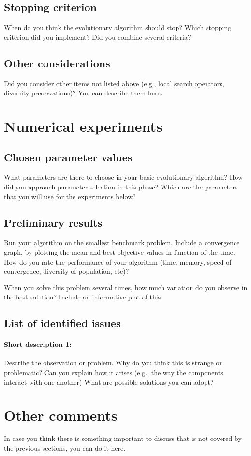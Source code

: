 \documentclass[a4paper,10pt]{article}
\newcommand{\ReplaceMe}[1]{{\color{blue}#1}}
\begin{document}
\subsection{Stopping criterion}

\ReplaceMe{When do you think the evolutionary algorithm should stop? Which stopping criterion did you implement? Did you combine several criteria?}

\subsection{Other considerations}

\ReplaceMe{Did you consider other items not listed above (e.g., local search operators, diversity preservations)? You can describe them here.}

\section{Numerical experiments}

\subsection{Chosen parameter values}

\ReplaceMe{What parameters are there to choose in your basic evolutionary algorithm? How did you approach parameter selection in this phase? Which are the parameters that you will use for the experiments below?}

\subsection{Preliminary results}

\ReplaceMe{Run your algorithm on the smallest benchmark problem. Include a convergence graph, by plotting the mean and best objective values in function of the time. How do you rate the performance of your algorithm (time, memory, speed of convergence, diversity of population, etc)? 

When you solve this problem several times, how much variation do you observe in the best solution? Include an informative plot of this.}

\subsection{List of identified issues}

\paragraph{Short description 1:} \ReplaceMe{Describe the observation or problem. Why do you think this is strange or problematic? Can you explain how it arises (e.g., the way the components interact with one another) What are possible solutions you can adopt?}

\section{Other comments}

\ReplaceMe{In case you think there is something important to discuss that is not covered by the previous sections, you can do it here.}
\end{document}
